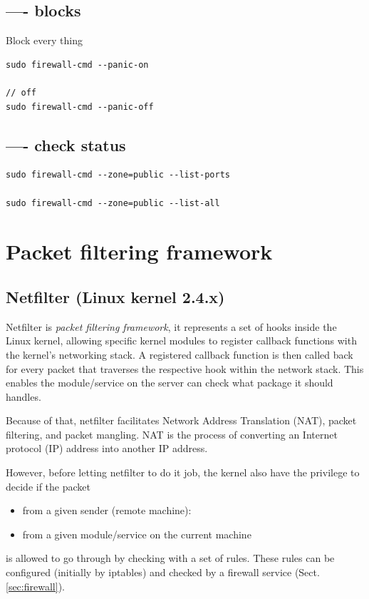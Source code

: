 \subsection{---- blocks}

Block every thing
\begin{verbatim}
sudo firewall-cmd --panic-on

// off
sudo firewall-cmd --panic-off
\end{verbatim}

\subsection{---- check status}

\begin{verbatim}
sudo firewall-cmd --zone=public --list-ports

sudo firewall-cmd --zone=public --list-all
\end{verbatim}

\section{Packet filtering framework}



\subsection{Netfilter (Linux kernel 2.4.x)}
\label{sec:netfilter}

Netfilter is {\it packet filtering framework}, it represents a set of hooks
inside the Linux kernel, allowing specific kernel modules to register callback
functions with the kernel's networking stack. A registered callback function is
then called back for every packet that traverses the respective hook within the
network stack. This enables the module/service on the server can check what
package it should handles. 

Because of that, netfilter facilitates Network Address Translation (NAT), packet
filtering, and packet mangling. NAT is the process of converting an Internet
protocol (IP) address into another IP address.

However, before letting netfilter to do it job, the kernel also have the
privilege to decide if the packet
\begin{itemize}
  \item from a given sender (remote machine):
  
  \item from a given module/service on the current machine
\end{itemize}
is allowed to go through by checking with a set of rules. These rules can be
configured (initially by iptables) and checked by a firewall service
(Sect.\ref{sec:firewall}). 

